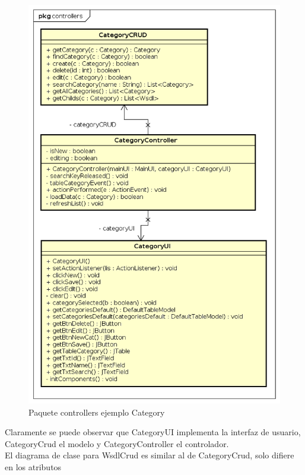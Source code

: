  \begin{figure}[H]  
 	\begin{center}
 		\includegraphics [scale=0.80]{imagenes/paquete_controllers.png}
 	\end{center}
 	\caption{Paquete controllers ejemplo Category}
 	\label{fig:Paquete controllers ejemplo category}
 \end{figure} 


 Claramente se puede observar que CategoryUI implementa la interfaz de usuario, CategoryCrud el modelo y CategoryController el controlador.\\
 
 El diagrama de clase para WsdlCrud es similar al de CategoryCrud, solo difiere en los atributos\\
 
